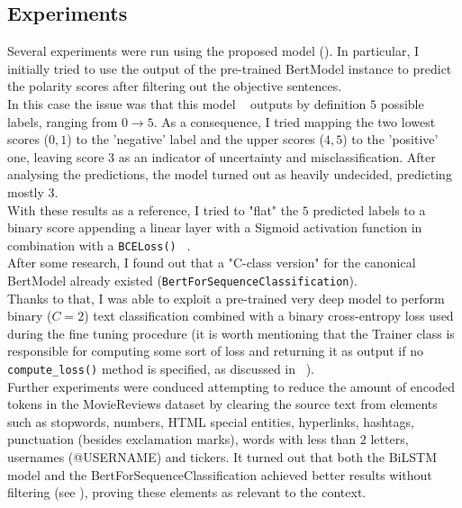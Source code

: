 \subsection{Experiments}
\label{subsec:exp}
Several experiments were run using the proposed model (\textbf{}). In particular, I initially tried to use the output 
of the pre-trained BertModel instance to predict the polarity scores after filtering out the objective sentences. \\
In this case the issue was that this model ~\cite{model} outputs by definition $5$ possible labels, ranging from $0 \to 5$. As a consequence,
I tried mapping the two lowest scores ($0,1$) to the 'negative' label and the upper scores ($4,5$) to the 'positive' one, leaving  score
$3$ as an indicator of uncertainty and misclassification. After analysing the predictions, the model turned out as heavily 
undecided, predicting mostly $3$.\\
With these results as a reference, I tried to "flat" the $5$ predicted labels to a binary score appending a linear layer with a Sigmoid activation function
in combination with a \texttt{BCELoss()} ~\cite{bce}. \\
After some research, I found out that a "C-class version" for the canonical BertModel already existed (\texttt{BertForSequenceClassification}).\\
Thanks to that, I was able to exploit a pre-trained very deep model to perform binary ($C=2$) text classification combined with a binary cross-entropy
loss used during the fine tuning procedure (it is worth mentioning that the Trainer class is responsible for computing some sort of loss 
and returning it as output if no \texttt{compute\_loss()} method is specified, as discussed in ~\cite{stack}). \\
Further experiments were conduced attempting to reduce the amount of encoded tokens in the MovieReviews dataset by clearing the source text from  elements such as stopwords, 
numbers, HTML special entities, hyperlinks, hashtags, punctuation (besides exclamation marks), words with less than $2$ letters, usernames (@USERNAME) and tickers. 
It turned out that both the BiLSTM model and the BertForSequenceClassification achieved better results without filtering (see \textbf{}), proving these 
elements as relevant to the context.

